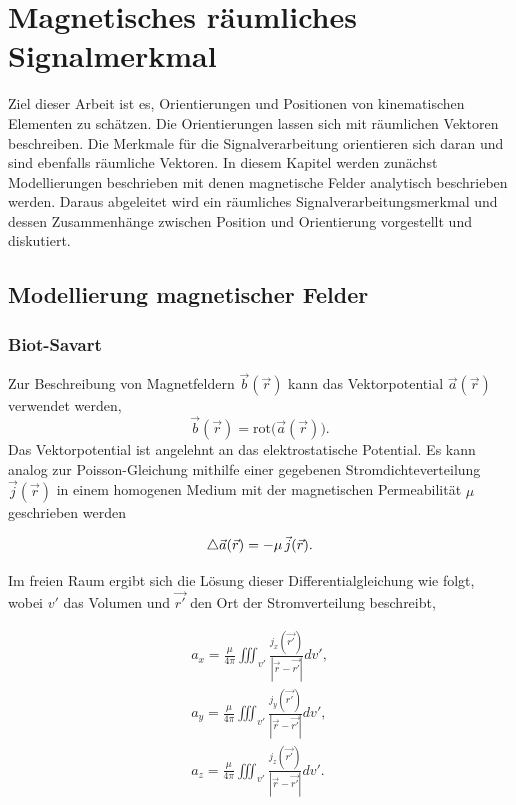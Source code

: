 \chapter{Magnetisches räumliches Signalmerkmal}
\label{chap:raeumliches_merkmal} 
Ziel dieser Arbeit ist es, Orientierungen und Positionen von kinematischen Elementen zu schätzen. Die Orientierungen lassen sich mit räumlichen Vektoren beschreiben. Die Merkmale für die Signalverarbeitung orientieren sich daran und sind ebenfalls räumliche Vektoren. In diesem Kapitel werden zunächst Modellierungen beschrieben mit denen magnetische Felder analytisch beschrieben werden. Daraus abgeleitet wird ein räumliches Signalverarbeitungsmerkmal und dessen Zusammenhänge zwischen Position und Orientierung vorgestellt und diskutiert.

\section{Modellierung magnetischer Felder}
\label{sec:modMagFeld}
\subsection{Biot-Savart}
\label{subsec:Biot_Savart}
Zur Beschreibung von Magnetfeldern $\vec{b}(\vec{r})$ kann das Vektorpotential $\vec{a}(\vec{r})$ verwendet werden, \cite{wolfgang_nolting_grundkurs_nodate} 
\begin{equation}
    \vec{b}(\vec{r}) = \text{rot}\bigr(\vec{a}(\vec{r})\bigl).
    \label{eq:VekPot}
\end{equation}
Das Vektorpotential ist angelehnt an das elektrostatische Potential. Es kann analog zur Poisson-Gleichung \cite{pinheiro_extended_2024} mithilfe einer gegebenen Stromdichteverteilung $\vec{j}(\vec{r})$ in einem homogenen Medium mit der magnetischen Permeabilität $\mu$ geschrieben werden \cite{wolfgang_nolting_grundkurs_nodate} 

\begin{equation}
    \mathop{}\!\mathbin\bigtriangleup \vec{a}(\vec{r}) = -\mu \,\vec{j}(\vec{r}).
    \label{eq:vekPotLap}
\end{equation}

Im freien Raum  ergibt sich die Lösung dieser Differentialgleichung wie folgt, wobei $v'$ das Volumen und $\vec{r'}$ den Ort der Stromverteilung beschreibt,\cite{henke_elektromagnetische_nodate} 

\begin{eqnarray}
    a_{x} = \frac{\mu}{4 \pi} \iiint_{v'} \frac{j_x(\vec{r'})}{|\vec{r}-\vec{r'}|} dv',
    \label{eq:VekPotX}\\
    a_{y} = \frac{\mu}{4 \pi} \iiint_{v'} \frac{j_y(\vec{r'})}{|\vec{r}-\vec{r'}|} dv',
    \label{eq:VekPotY}\\
    a_{z} = \frac{\mu}{4 \pi} \iiint_{v'} \frac{j_z(\vec{r'})}{|\vec{r}-\vec{r'}|} dv'.
    \label{eq:VekPotZ}
\end{eqnarray}

